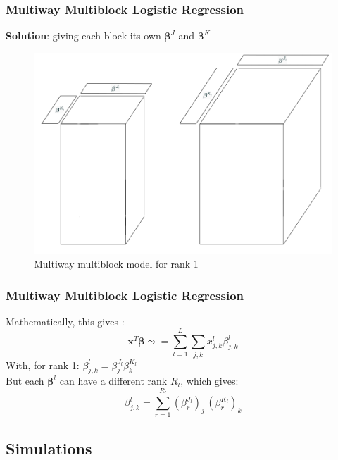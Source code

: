 \documentclass{beamer}
\begin{document}
\begin{frame}
    \frametitle{Multiway Multiblock Logistic Regression}
    \vspace{10 pt}
    \textbf{Solution}: giving each block its own $\bm{\beta}^J$ and $\bm{\beta}^K$\\[15 pt]
    \begin{figure}
        \centering
        \includegraphics[scale = 0.28]{images/beta_blocks.png}
        \caption{Multiway multiblock model for rank 1}
    \end{figure}
\end{frame}

\begin{frame}
    \frametitle{Multiway Multiblock Logistic Regression}
    Mathematically, this gives :
    $$\mathbf{x}^T\bm{\beta} \leadsto =  \sum\limits_{l = 1}^L \sum\limits_{j,k} x_{j,k}^l\beta_{j,k}^l$$
    With, for rank 1: $\beta_{j,k}^l = \beta_j^{J_l}\beta_k^{K_l}$\\[10 pt]
    But each $\bm{\beta}^l$ can have a different rank $R_l$, which gives:
    $$\beta_{j,k}^l = \sum\limits_{r = 1}^{R_l} (\beta_r^{J_l})_j \, (\beta_r^{K_l})_k $$
\end{frame}

\begin{frame}
    \section{Simulations}    
\end{frame}
\end{document}
